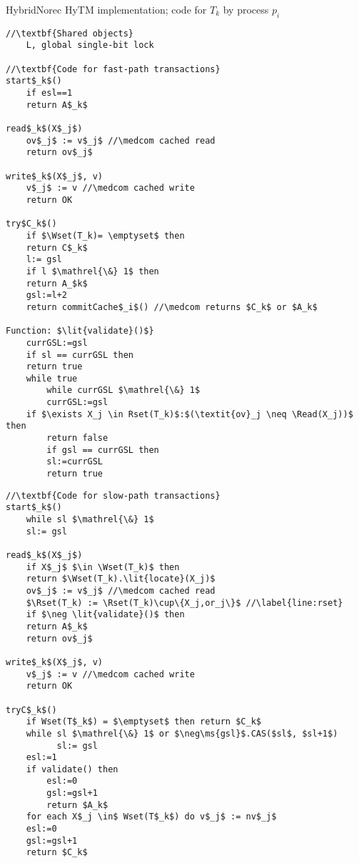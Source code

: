 \begin{algorithm*}[!h]
\caption{HybridNorec HyTM implementation; code for $T_k$ by process $p_i$}
\label{alg:inswrite3}
\vspace{-1mm}
\noindent\lstset{style=customc}
\begin{minipage}{0.49\textwidth}
\begin{lstlisting}[frame=none,firstnumber=1,mathescape=true]
//\textbf{Shared objects}
    L, global single-bit lock

//\textbf{Code for fast-path transactions}
start$_k$()
    if esl==1
	return A$_k$

read$_k$(X$_j$)
    ov$_j$ := v$_j$ //\medcom cached read
    return ov$_j$

write$_k$(X$_j$, v)
    v$_j$ := v //\medcom cached write
    return OK

try$C_k$()
    if $\Wset(T_k)= \emptyset$ then
	return C$_k$
    l:= gsl
    if l $\mathrel{\&} 1$ then
	return A_$k$
    gsl:=l+2
    return commitCache$_i$() //\medcom returns $C_k$ or $A_k$

Function: $\lit{validate}()$}
    currGSL:=gsl
    if sl == currGSL then
	return true
    while true
        while currGSL $\mathrel{\&} 1$
	    currGSL:=gsl
	if $\exists X_j \in Rset(T_k)$:$(\textit{ov}_j \neq \Read(X_j))$ then
	    return false
    	if gsl == currGSL then
	    sl:=currGSL
	    return true

\end{lstlisting}
\end{minipage}
\begin{minipage}{0.49\textwidth}
\begin{lstlisting}[frame=none,firstnumber=last,mathescape=true]
//\textbf{Code for slow-path transactions}
start$_k$()
    while sl $\mathrel{\&} 1$
	sl:= gsl

read$_k$(X$_j$)
    if X$_j$ $\in \Wset(T_k)$ then
	return $\Wset(T_k).\lit{locate}(X_j)$ 
    ov$_j$ := v$_j$ //\medcom cached read
    $\Rset(T_k) := \Rset(T_k)\cup\{X_j,or_j\}$ //\label{line:rset}
    if $\neg \lit{validate}()$ then 
	return A$_k$
    return ov$_j$

write$_k$(X$_j$, v)
    v$_j$ := v //\medcom cached write
    return OK

tryC$_k$()
    if Wset(T$_k$) = $\emptyset$ then return $C_k$
    while sl $\mathrel{\&} 1$ or $\neg\ms{gsl}$.CAS($sl$, $sl+1$)  
          sl:= gsl
    esl:=1
    if validate() then
        esl:=0
        gsl:=gsl+1
        return $A_k$
    for each X$_j \in$ Wset(T$_k$) do v$_j$ := nv$_j$
    esl:=0
    gsl:=gsl+1
    return $C_k$
\end{lstlisting}
\end{minipage}
\vspace{-1mm}
\end{algorithm*}

